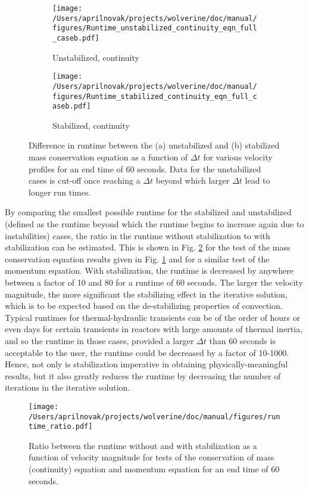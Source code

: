 \documentclass[10pt]{article}
\numberwithin{equation}{section} %
\begin{document}
\begin{figure}[H]
\centering
\begin{subfigure}{0.45\textwidth}
  \centering
  \texttt{[image: /Users/aprilnovak/projects/wolverine/doc/manual/figures/Runtime\_unstabilized\_continuity\_eqn\_full\_caseb.pdf]}
  \caption{Unstabilized, continuity}
\end{subfigure}
\begin{subfigure}{0.45\textwidth}
  \centering
  \texttt{[image: /Users/aprilnovak/projects/wolverine/doc/manual/figures/Runtime\_stabilized\_continuity\_eqn\_full\_caseb.pdf]}
  \caption{Stabilized, continuity}
\end{subfigure}
\caption{Difference in runtime between the (a) unstabilized and (b) stabilized mass conservation equation as a function of \(\Delta t\) for various velocity profiles for an end time of 60 seconds. Data for the unstabilized cases is cut-off once reaching a \(\Delta t\) beyond which larger \(\Delta t\) lead to longer run times.}
\label{fig:runtime1}
\end{figure}

By comparing the smallest possible runtime for the stabilized and unstabilized (defined as the runtime beyond which the runtime begins to increase again due to instabilities) cases, the ratio in the runtime without stabilization to with stabilization can be estimated. This is shown in Fig. \ref{fig:runtime2} for the test of the mass conservation equation results given in Fig. \ref{fig:runtime1} and for a similar test of the momentum equation. With stabilization, the runtime is decreased by anywhere between a factor of 10 and 80 for a runtime of 60 seconds. The larger the velocity magnitude, the more significant the stabilizing effect in the iterative solution, which is to be expected based on the de-stabilizing properties of convection. Typical runtimes for thermal-hydraulic transients can be of the order of hours or even days for certain transients in reactors with large amounts of thermal inertia, and so the runtime in those cases, provided a larger \(\Delta t\) than 60 seconds is acceptable to the user, the runtime could be decreased by a factor of 10-1000. Hence, not only is stabilization imperative in obtaining physically-meaningful results, but it also greatly reduces the runtime by decreasing the number of iterations in the iterative solution.

 \begin{figure}[H]
  \centering
  \texttt{[image: /Users/aprilnovak/projects/wolverine/doc/manual/figures/runtime\_ratio.pdf]}
  \caption{Ratio between the runtime without and with stabilization as a function of velocity magnitude for tests of the conservation of mass (continuity) equation and momentum equation for an end time of 60 seconds.}
  \label{fig:runtime2}
\end{figure}
\end{document}
